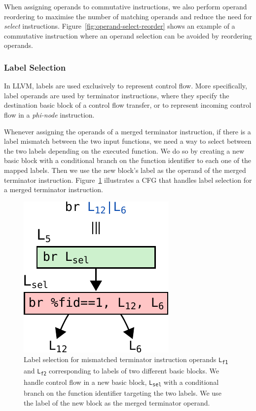 When assigning operands to commutative instructions, we also perform operand
reordering to maximise the number of matching operands and reduce the need for
\textit{select} instructions.
Figure~\ref{fig:operand-select-reorder} shows an example of a commutative instruction
where an operand selection can be avoided by reordering operands.

\subsubsection{Label Selection} \label{sec:label-select}

In LLVM, labels are used exclusively to represent control flow.
More specifically, label operands are used by terminator instructions, where
they specify the destination basic block of a control flow transfer, or
to represent incoming control flow in a \textit{phi-node} instruction.

Whenever assigning the operands of a merged terminator instruction, if there is
a label mismatch between the two input functions, we need a way to select
between the two labels depending on the executed function.
We do so by creating a new basic block with a conditional branch on the function
identifier to each one of the mapped labels. Then we use the new block's label as
the operand of the merged terminator instruction.
Figure~\ref{fig:label-select} illustrates a CFG that handles label selection for
a merged terminator instruction.

\begin{figure}[t]
  \centering
  \includegraphics[scale=0.65]{src/merge-operation/figs/label-select.pdf}
  \caption{Label selection for mismatched terminator instruction operands
	\texttt{L\textsubscript{f1}} and \texttt{L\textsubscript{f2}} corresponding
	to labels of two different basic blocks. We handle control flow in a new
	basic block, \texttt{L\textsubscript{sel}} with a conditional branch on the
	function identifier targeting the two labels. We use the label of the new
	block as the merged terminator operand.}
  \label{fig:label-select}
\end{figure}

